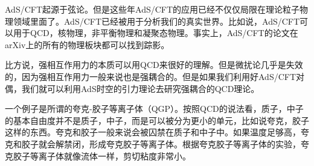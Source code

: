 
AdS/CFT起源于弦论。但是这些年AdS/CFT的应用已经不仅仅局限在理论粒子物理领域里面了。AdS/CFT已经被用于分析我们的真实世界。比如说，AdS/CFT可以用于QCD，核物理，非平衡物理和凝聚态物理。事实上，AdS/CFT的论文在arXiv上的所有的物理板块都可以找到踪影。

比方说，强相互作用力的本质可以用QCD来很好的理解。但是微扰论几乎是失效的，因为强相互作用力一般来说也是强耦合的。但是如果我们利用好AdS/CFT对偶，我们就可以利用AdS时空的引力理论去研究强耦合的QCD理论。

一个例子是所谓的夸克-胶子等离子体（QGP）。按照QCD的说法看，质子，中子的基本自由度并不是质子，中子，而是可以被分为更小的单元，比如说夸克，胶子这样的东西。夸克和胶子一般来说会被囚禁在质子和中子中。如果温度足够高，夸克和胶子就会解禁闭，形成夸克胶子等离子体。根据夸克胶子等离子体的实验，夸克胶子等离子体就像流体一样，剪切粘度非常小。